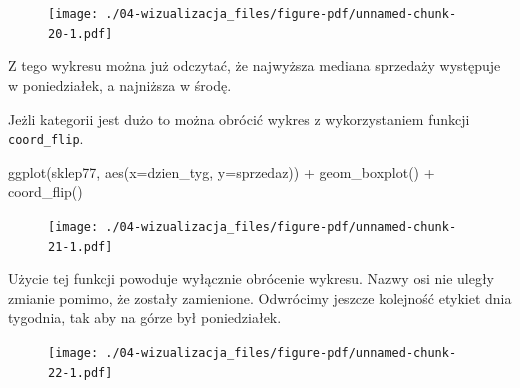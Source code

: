 \documentclass[
  letterpaper,
  DIV=11,
  numbers=noendperiod]{scrreprt}
\newenvironment{Shaded}{\begin{snugshade}}{\end{snugshade}}
\newcommand{\AttributeTok}[1]{\textcolor[rgb]{0.40,0.45,0.13}{#1}}
\newcommand{\FunctionTok}[1]{\textcolor[rgb]{0.28,0.35,0.67}{#1}}
\newcommand{\NormalTok}[1]{\textcolor[rgb]{0.00,0.23,0.31}{#1}}
\newcommand{\SpecialCharTok}[1]{\textcolor[rgb]{0.37,0.37,0.37}{#1}}
\begin{document}
\begin{figure}[H]

{\centering \texttt{[image: ./04-wizualizacja\_files/figure-pdf/unnamed-chunk-20-1.pdf]}

}

\end{figure}

Z tego wykresu można już odczytać, że najwyższa mediana sprzedaży
występuje w poniedziałek, a najniższa w środę.

Jeżli kategorii jest dużo to można obrócić wykres z wykorzystaniem
funkcji \texttt{coord\_flip}.

\begin{Shaded}
\begin{Highlighting}[]
\FunctionTok{ggplot}\NormalTok{(sklep77, }\FunctionTok{aes}\NormalTok{(}\AttributeTok{x=}\NormalTok{dzien\_tyg, }\AttributeTok{y=}\NormalTok{sprzedaz)) }\SpecialCharTok{+}
  \FunctionTok{geom\_boxplot}\NormalTok{() }\SpecialCharTok{+}
  \FunctionTok{coord\_flip}\NormalTok{()}
\end{Highlighting}
\end{Shaded}

\begin{figure}[H]

{\centering \texttt{[image: ./04-wizualizacja\_files/figure-pdf/unnamed-chunk-21-1.pdf]}

}

\end{figure}

Użycie tej funkcji powoduje wyłącznie obrócenie wykresu. Nazwy osi nie
uległy zmianie pomimo, że zostały zamienione. Odwrócimy jeszcze
kolejność etykiet dnia tygodnia, tak aby na górze był poniedziałek.

\begin{Shaded}
\end{Shaded}

\begin{figure}[H]

{\centering \texttt{[image: ./04-wizualizacja\_files/figure-pdf/unnamed-chunk-22-1.pdf]}

}

\end{figure}
\end{document}
